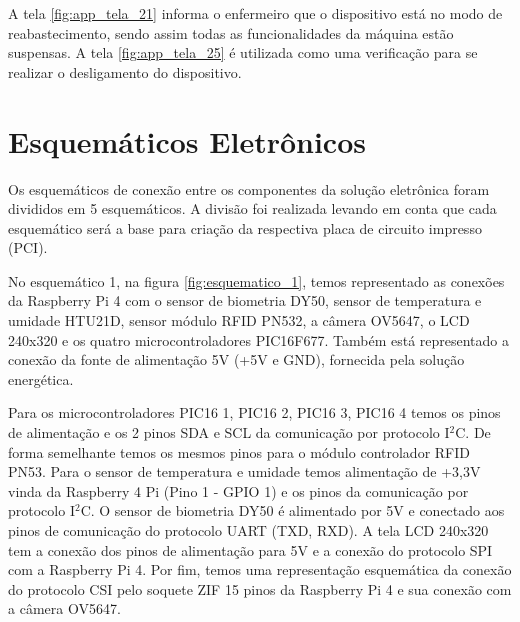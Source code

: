 \begin{apendicesenv}
A tela \ref{fig:app_tela_21} informa o enfermeiro que o dispositivo está no modo de reabastecimento, sendo assim todas as funcionalidades da máquina estão suspensas. A tela \ref{fig:app_tela_25} é utilizada como uma verificação para se realizar o desligamento do dispositivo.

\chapter{Esquemáticos Eletrônicos}\label{esquematicos_eletronica}

Os esquemáticos de conexão entre os componentes da solução eletrônica foram divididos em 5 esquemáticos. A divisão foi realizada levando em conta que cada esquemático será a base para criação da respectiva placa de circuito impresso (PCI).

No esquemático 1, na figura \ref{fig:esquematico_1}, temos representado as conexões da Raspberry Pi 4 com o sensor de biometria DY50, sensor de temperatura e umidade HTU21D, sensor módulo RFID PN532, a câmera OV5647, o LCD 240x320 e os quatro microcontroladores PIC16F677. Também está representado a conexão da fonte de alimentação 5V (+5V e GND), fornecida pela solução energética. 

Para os microcontroladores PIC16 1, PIC16 2, PIC16 3, PIC16 4 temos os pinos de alimentação e os 2 pinos SDA e SCL da comunicação por protocolo I$^2$C. De forma semelhante temos os mesmos pinos para o módulo controlador RFID PN53. Para o sensor de temperatura e umidade temos alimentação de +3,3V vinda da Raspberry 4 Pi (Pino 1 - GPIO 1) e os pinos da comunicação por protocolo I$^2$C. O sensor de biometria DY50 é alimentado por 5V e conectado aos pinos de comunicação do protocolo UART (TXD, RXD). A tela LCD 240x320 tem a conexão dos pinos de alimentação para 5V e a conexão do protocolo SPI com a Raspberry Pi 4. Por fim, temos uma representação esquemática da conexão do protocolo CSI pelo soquete ZIF 15 pinos da Raspberry Pi 4 e sua conexão com a câmera OV5647.


\end{apendicesenv}
